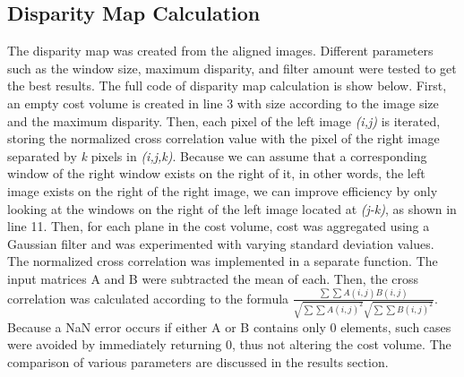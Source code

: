 \subsection{Disparity Map Calculation}
The disparity map was created from the aligned images. Different parameters such as the window size, maximum disparity, and filter amount were tested to get the best results. The full code of disparity map calculation is show below. First, an empty cost volume is created in line 3 with size according to the image size and the maximum disparity. Then, each pixel of the left image \emph{(i,j)} is iterated, storing the normalized cross correlation value with the pixel of the right image separated by \emph{k} pixels in \emph{(i,j,k)}. Because we can assume that a corresponding window of the right window exists on the right of it, in other words, the left image exists on the right of the right image, we can improve efficiency by only looking at the windows on the right of the left image located at \emph{(j-k)}, as shown in line 11. Then, for each plane in the cost volume, cost was aggregated using a Gaussian filter and was experimented with varying standard deviation values. The normalized cross correlation was implemented in a separate function. The input matrices A and B were subtracted the mean of each. Then, the cross correlation was calculated according to the formula $\frac{ \sum \sum A(i,j)B(i,j)}{\sqrt{\sum \sum A(i,j)^{2}}\sqrt{\sum \sum B(i,j)^{2}}}$. Because a NaN error occurs if either A or B contains only 0 elements, such cases were avoided by immediately returning 0, thus not altering the cost volume. The comparison of various parameters are discussed in the results section.
